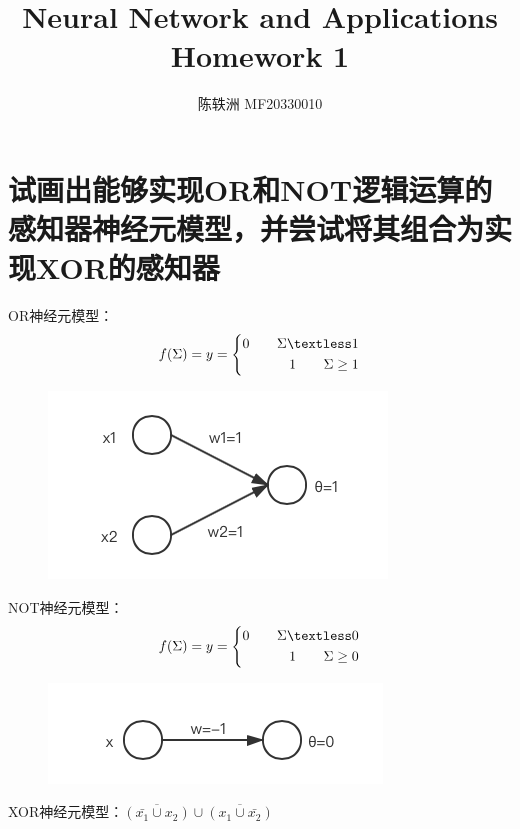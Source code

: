 \documentclass{article}
\title{Neural Network and Applications\\Homework 1}
\author{陈轶洲 MF20330010}
\begin{document}
	\maketitle
\section{试画出能够实现OR和NOT逻辑运算的感知器神经元模型，并尝试将其组合为实现XOR的感知器}
		
\hspace{1.1em} OR神经元模型：
\begin{equation}
	f(\Sigma) = y = \left\{
	\begin{aligned}
		0 \qquad\Sigma \textless 1\\
		1 \qquad\Sigma \ge 1
	\end{aligned} 
\right.
\end{equation}

\begin{figure}[H]
	\centering
	\includegraphics{OR.png}
\end{figure}


NOT神经元模型：
\begin{equation}
	f(\Sigma) = y = \left\{
	\begin{aligned}
		0 \qquad\Sigma \textless 0\\
		1 \qquad\Sigma \ge 0
	\end{aligned} 
	\right.
\end{equation}

\begin{figure}[H]
	\centering
	\includegraphics{NOT.png}
\end{figure}

XOR神经元模型：$\overline{(\bar{x_{1}} \cup  x_{2})}\cup  \overline{(x_{1} \cup \bar{x_{2}})}$
\end{document}
